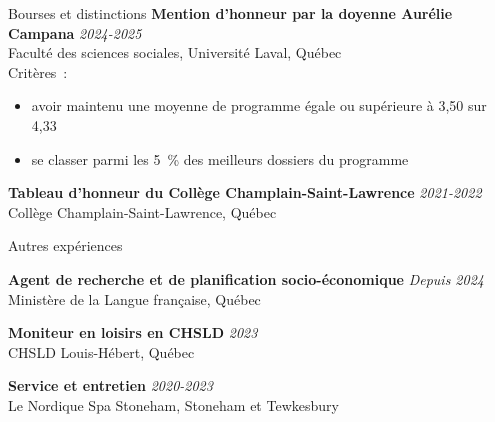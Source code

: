 \documentclass{resume} %
\begin{document}
\begin{rSection}{Bourses et distinctions}
{\bf Mention d'honneur par la doyenne Aurélie Campana} \hfill {\em 2024-2025}
\\ Faculté des sciences sociales, Université Laval, Québec
\\ Critères~:
\begin{itemize}
	\vspace{-0.1cm}\item avoir maintenu une moyenne de programme égale ou supérieure à 3,50 sur 4,33
	\vspace{-0.3cm}\item se classer parmi les 5~\% des meilleurs dossiers du programme
\end{itemize}

{\bf Tableau d'honneur du Collège Champlain-Saint-Lawrence} \hfill {\em 2021-2022}
\\ Collège Champlain-Saint-Lawrence, Québec

\end{rSection}


\begin{rSection}{Autres expériences}

{\bf Agent de recherche et de planification socio-économique} \hfill {\em Depuis 2024}
\\ Ministère de la Langue française, Québec

{\bf Moniteur en loisirs en CHSLD} \hfill {\em 2023}
\\ CHSLD Louis-Hébert, Québec

{\bf Service et entretien} \hfill {\em 2020-2023}
\\ Le Nordique Spa Stoneham, Stoneham et Tewkesbury

\end{rSection}

\end{document}

